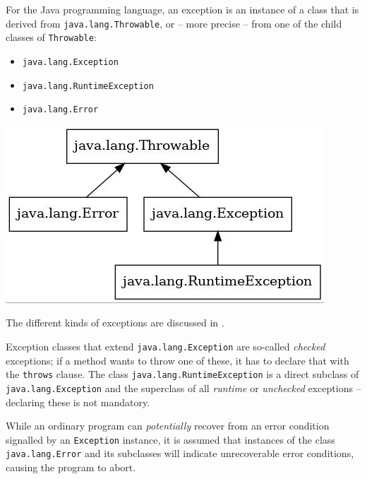 \documentclass[11pt,a4paper, titlepage, parskip=half, headsepline, footsepline, cleardoublepage=current, headheight=1cm]{scrbook}
\begin{document}
For the Java programming language, an exception is an instance of a class that is derived from \lstinline|java.lang.Throwable|\autocite{ORACLE_DOC_THROWABLE_CLASS}, or – more precise – from one of the child classes of \lstinline|Throwable|:
\begin{itemize}[nosep]
\item{\lstinline|java.lang.Exception|\autocite{ORACLE_DOC_EXCEPTION_CLASS}}
\item{\lstinline|java.lang.RuntimeException|\autocite{ORACLE_DOC_RUNTIMEEXCEPTION_CLASS}}
\item{\lstinline|java.lang.Error|\autocite{ORACLE_DOC_ERROR_CLASS}}
\end{itemize}
\includegraphics{exception}
\newline

The different kinds of exceptions are discussed in \autocite{ORACLE_DOC_LANGUAGE_SPECIFICATION:KindsOfExceptions}.

Exception classes that extend \lstinline|java.lang.Exception| are so-called \textit{checked} exceptions; if a method wants to throw one of these, it has to declare that with the \lstinline|throws| clause. The class \lstinline|java.lang.RuntimeException| is a direct subclass of \lstinline|java.lang.Exception| and the superclass of all \textit{runtime} or \textit{unchecked} exceptions – declaring these is not mandatory.

While an ordinary program can \textit{potentially} recover from an error condition signalled by an \lstinline|Exception| instance, it is assumed that instances of the class \lstinline|java.lang.Error| and its subclasses will indicate unrecoverable error conditions, causing the program to abort.
\end{document}
